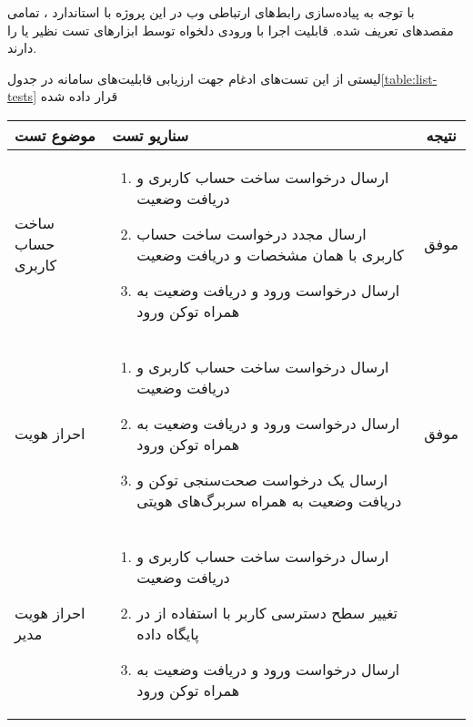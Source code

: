 با توجه به پیاده‌سازی رابط‌های ارتباطی وب در این پروژه با استاندارد ، تمامی مقصد‌های تعریف شده. قابلیت اجرا با ورودی دلخواه توسط ابزار‌های تست  نظیر  یا  را دارند.


لیستی از این تست‌های ادغام جهت ارزیابی قابلیت‌های سامانه در جدول\ref{table:list-tests} قرار داده شده

\begin{center}
	\begin{longtable}{ | P{2cm} | P{11cm} | c | } 
		\hline
		موضوع تست & سناریو تست & نتیجه \\ [1 cm] 
		\hline
		\hline
		ساخت حساب کاربری &
		{\footnotesize
		\begin{enumerate}[rightmargin=1cm,topsep=0pt,partopsep=0pt]
			\item ارسال درخواست ساخت حساب کاربری و دریافت وضعیت 
			\item ارسال مجدد درخواست ساخت حساب کاربری با همان مشخصات و دریافت وضعیت 
			\item ارسال درخواست ورود و دریافت وضعیت  به همراه توکن ورود
		\end{enumerate} 
	} &
		موفق \\
		\hline
		
		احراز هویت &
{\footnotesize
\begin{enumerate}[rightmargin=1cm,topsep=0pt,partopsep=0pt]
	\item ارسال درخواست ساخت حساب کاربری و دریافت وضعیت 
	
	\item ارسال درخواست ورود و دریافت وضعیت  به همراه توکن ورود
	
	\item ارسال یک درخواست صحت‌سنجی توکن و دریافت وضعیت  به همراه سربرگ‌های هویتی
\end{enumerate}
} &
موفق \\ \hline
		
		
		احراز هویت مدیر &
		{\footnotesize
		\begin{enumerate}[rightmargin=1cm,topsep=0pt,partopsep=0pt]
			\item ارسال درخواست ساخت حساب کاربری و دریافت وضعیت 
			
			\item تغییر سطح دسترسی کاربر با استفاده‌ از  در پایگاه داده
			
			\item ارسال درخواست ورود و دریافت وضعیت  به همراه توکن ورود
			

\end{enumerate}}
\end{longtable}
\end{center}
